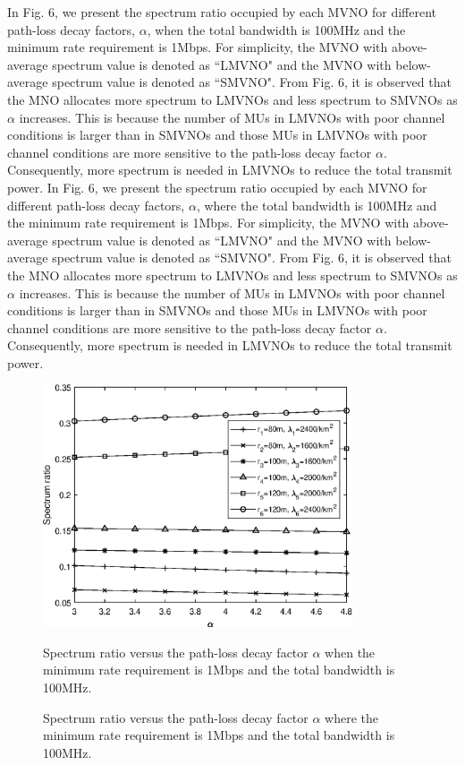 \documentclass[journal]{IEEEtran}
\begin{document}
\begin{IEEEkeywords}
In Fig. 6, we present the spectrum ratio occupied by each MVNO for different path-loss decay factors, $\alpha$, when the total bandwidth is 100MHz and the minimum rate requirement is 1Mbps. For simplicity, the MVNO with above-average spectrum value is denoted as ``LMVNO" and the MVNO with below-average spectrum value is denoted as ``SMVNO". From Fig. 6, it is observed that the MNO allocates more spectrum to LMVNOs and less spectrum to SMVNOs as $\alpha$ increases. This is because the number of MUs in LMVNOs with poor channel conditions is larger than in SMVNOs and those MUs in LMVNOs with poor channel conditions are more sensitive to the path-loss decay factor $\alpha$. Consequently, more spectrum is needed in LMVNOs to reduce the total transmit power.
In Fig. 6, we present the spectrum ratio occupied by each MVNO for different path-loss decay factors, $\alpha$, where the total bandwidth is 100MHz and the minimum rate requirement is 1Mbps. For simplicity, the MVNO with above-average spectrum value is denoted as ``LMVNO" and the MVNO with below-average spectrum value is denoted as ``SMVNO". From Fig. 6, it is observed that the MNO allocates more spectrum to LMVNOs and less spectrum to SMVNOs as $\alpha$ increases. This is because the number of MUs in LMVNOs with poor channel conditions is larger than in SMVNOs and those MUs in LMVNOs with poor channel conditions are more sensitive to the path-loss decay factor $\alpha$. Consequently, more spectrum is needed in LMVNOs to reduce the total transmit power.
 
\begin{figure}
	\centering
	\includegraphics[width=3.6in]{SR_alpha.eps}
	\caption{Spectrum ratio versus the path-loss decay factor $\alpha$ when the minimum rate requirement is 1Mbps and the total bandwidth is 100MHz.}
	\caption{Spectrum ratio versus the path-loss decay factor $\alpha$ where the minimum rate requirement is 1Mbps and the total bandwidth is 100MHz.}
\end{figure}



\end{IEEEkeywords}
\end{document}
